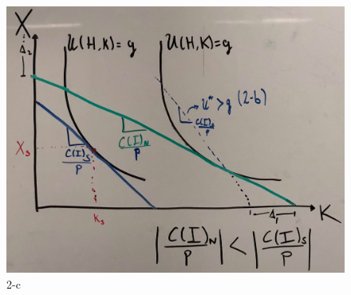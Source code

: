 \documentclass[12pt]{paper}
\begin{document}
\begin{figure}
\includegraphics[width=\textwidth]{2-c}
\caption{2-c}

\end{figure}

\begin{align*}
\end{align*}
\end{document}
